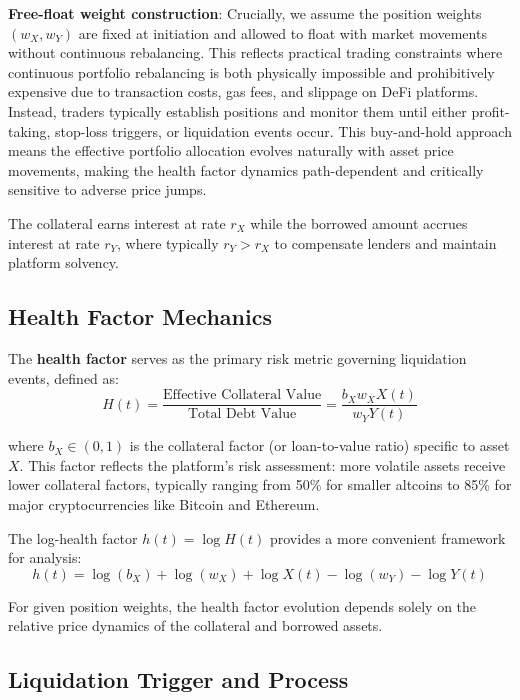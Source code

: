 \documentclass{article}
\theoremstyle{definition}
\begin{document}
\textbf{Free-float weight construction}: Crucially, we assume the position weights $(w_X, w_Y)$ are fixed at initiation and allowed to float with market movements without continuous rebalancing. This reflects practical trading constraints where continuous portfolio rebalancing is both physically impossible and prohibitively expensive due to transaction costs, gas fees, and slippage on DeFi platforms. Instead, traders typically establish positions and monitor them until either profit-taking, stop-loss triggers, or liquidation events occur. This buy-and-hold approach means the effective portfolio allocation evolves naturally with asset price movements, making the health factor dynamics path-dependent and critically sensitive to adverse price jumps.

The collateral earns interest at rate $r_X$ while the borrowed amount accrues interest at rate $r_Y$, where typically $r_Y > r_X$ to compensate lenders and maintain platform solvency.

\subsection{Health Factor Mechanics}

The \textbf{health factor} serves as the primary risk metric governing liquidation events, defined as:
\begin{equation}
H(t) = \frac{\text{Effective Collateral Value}}{\text{Total Debt Value}} = \frac{b_X w_X X(t)}{w_Y Y(t)} \label{eq:health_factor_def}
\end{equation}

where $b_X \in (0,1)$ is the collateral factor (or loan-to-value ratio) specific to asset $X$. This factor reflects the platform's risk assessment: more volatile assets receive lower collateral factors, typically ranging from 50\% for smaller altcoins to 85\% for major cryptocurrencies like Bitcoin and Ethereum.

The log-health factor $h(t) = \log H(t)$ provides a more convenient framework for analysis:
\begin{equation}
h(t) = \log(b_X) + \log(w_X) + \log X(t) - \log(w_Y) - \log Y(t) \label{eq:log_health}
\end{equation}

For given position weights, the health factor evolution depends solely on the relative price dynamics of the collateral and borrowed assets.

\subsection{Liquidation Trigger and Process}
\end{document}
